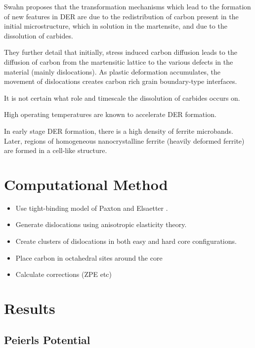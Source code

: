\documentclass[a4paper]{article}
\begin{document}
Swahn proposes that the transformation mechanisms which lead to the
formation of new features in DER are due to the redistribution of
carbon present in the initial microstructure, which in solution in
the martensite, and due to the dissolution of carbides. 

They further detail that initially, stress induced carbon diffusion
leads to the diffusion of carbon from the martensitic lattice to
the various defects in the material (mainly dislocations). 
As plastic deformation accumulates, the movement of dislocations
creates carbon rich grain boundary-type interfaces. 

It is not certain what role and timescale the dissolution of
carbides occurs on. 

High operating temperatures are known to accelerate DER formation. 

In early stage DER formation, there is a high density of ferrite
microbands. Later, regions of homogeneous nanocrystalline ferrite
(heavily deformed ferrite) are formed in a cell-like structure.







\section{Computational Method}
\label{sec:org5ce0196}

\begin{itemize}
\item Use tight-binding model of Paxton and Elsaetter \cite{Paxton2013}.
\item Generate dislocations using anisotropic elasticity theory.
\item Create clusters of dislocations in both easy and hard core
configurations.
\item Place carbon in octahedral sites around the core
\item Calculate corrections (ZPE etc)
\end{itemize}


\section{Results}
\label{sec:orga7443f7}



\subsection{Peierls Potential}
\label{sec:org77256e5}
\end{document}

